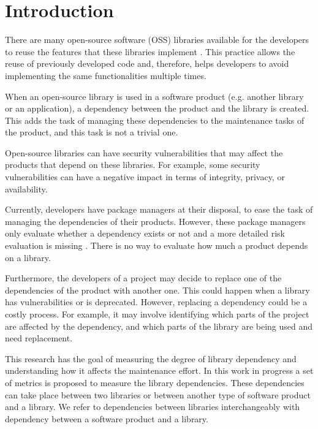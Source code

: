 \documentclass[a4paper]{article}
\begin{document}
\section{Introduction}

There are many open-source software (OSS) libraries available for the developers to reuse the features that these libraries implement \cite{kikas2017structure}. This practice allows the reuse of previously developed code and, therefore, helps developers to avoid implementing the same functionalities multiple times.

When an open-source library is used in a software product (e.g. another library or an application), a dependency between the product and the library is created. This adds the task of managing these dependencies to the maintenance tasks of the product, and this task is not a trivial one.

Open-source libraries can have security vulnerabilities that may affect the products that depend on these libraries. For example, some security vulnerabilities can have a negative impact in terms of integrity, privacy, or availability.

Currently, developers have package managers at their disposal, to ease the task of managing the dependencies of their products. However, these package managers only evaluate whether a dependency exists or not and a more detailed risk evaluation is missing \cite{hejderup2018prazi}. There is no way to evaluate how much a product depends on a library.

Furthermore, the developers of a project may decide to replace one of the dependencies of the product with another one. This could happen when a library has vulnerabilities or is deprecated.
However, replacing a dependency could be a costly process. For example, it may involve identifying which parts of the project are affected by the dependency, and which parts of the library are being used and need replacement.

This research has the goal of measuring the degree of library dependency and understanding how it affects the maintenance effort. In this work in progress a set of metrics is proposed to measure the library dependencies. These dependencies can take place between two libraries or between another type of software product and a library. We refer to dependencies between libraries interchangeably with dependency between a software product and a library.
\end{document}
